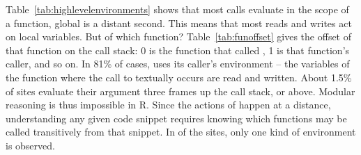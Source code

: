 \documentclass[review,screen,acmsmall]{acmart}%
\begin{document}
Table~\ref{tab:highlevelenvironments} shows that most calls evaluate in the
scope of a function, global is a distant second. This means that most reads and
writes act on local variables. But of which function? Table~\ref{tab:funoffset}
gives the offset of that function on the call stack: 0 is the function that called
\eval, 1 is that function's caller, and so on. In 81\% of cases, \eval uses
its caller's environment -- the variables of the function where the call to \eval
textually occurs are read and written. About 1.5\% of sites evaluate their
argument three frames up the call stack, or above. Modular reasoning is thus
impossible in R. Since the actions of \eval happen at a distance, understanding
any given code snippet requires knowing which functions may be called
transitively from that snippet. In \packageNbOneCategoryEnvirSitePercent of
the sites, only one kind of environment is observed.
\end{document}
